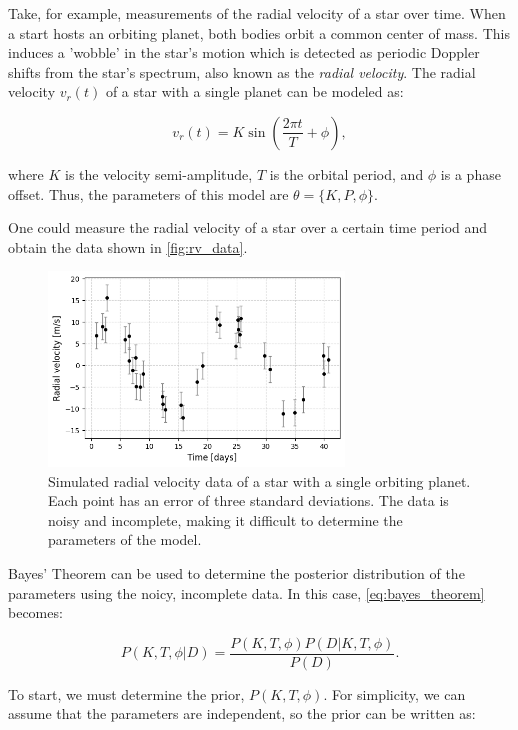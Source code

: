 \documentclass[preprint,longauthor]{aastex631}
\numberwithin{equation}{section}
\begin{document}
Take, for example, measurements of the radial velocity of a star over time. When a start hosts an orbiting planet, both bodies orbit a common center of mass. This induces a 'wobble' in the star's motion which is detected as periodic Doppler shifts from the star's spectrum, also known as the \textit{radial velocity}. The radial velocity $v_r(t)$ of a star with a single planet can be modeled as:

\begin{equation}
  v_r(t) = K \sin\left(\frac{2\pi t}{T} + \phi\right),
\end{equation}

where $K$ is the velocity semi-amplitude, $T$ is the orbital period, and $\phi$ is a phase offset. Thus, the parameters of this model are $\theta = \{K,P,\phi\}$.

One could measure the radial velocity of a star over a certain time period and obtain the data shown in \autoref{fig:rv_data}.

\begin{figure}[ht!]
\centering
\includegraphics[width=0.7\textwidth]{../scripts/2.2/figures/data.png}
\caption{Simulated radial velocity data of a star with a single orbiting planet. Each point has an error of three standard deviations. The data is noisy and incomplete, making it difficult to determine the parameters of the model.}
\label{fig:rv_data}
\end{figure}

Bayes' Theorem can be used to determine the posterior distribution of the parameters using the noicy, incomplete data. In this case, \autoref{eq:bayes_theorem} becomes:

\begin{equation}
  P(K,T,\phi|D) = \frac{P(K,T,\phi)P(D|K,T,\phi)}{P(D)}.
\end{equation}

To start, we must determine the prior, $P(K,T,\phi)$. For simplicity, we can assume that the parameters are independent, so the prior can be written as:
\end{document}
